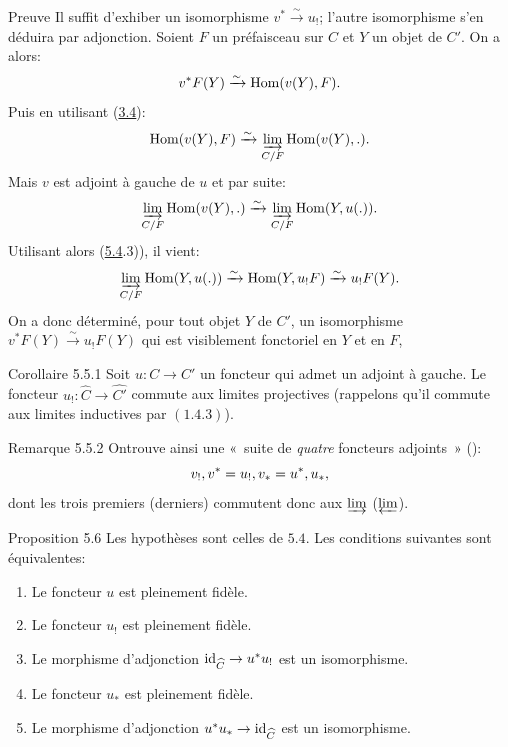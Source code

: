 \documentclass[10pt]{../fichiers-configuration-latex/smfart}
\def\labelenumi{(\theenumi)}
\begin{document}
\begin{enonce*}[remark]{Preuve}
Il suffit d'exhiber un isomorphisme $v^\ast\xrightarrow{\sim}
u_{!}$; l'autre isomorphisme s'en déduira par adjonction. Soient $F$
un préfaisceau sur $C$ et $Y$ un objet de $C'$. On a alors:
$$
v^\ast F(Y)\xrightarrow{\sim} \operatorname{Hom}(v(Y),F){}.
$$
Puis en utilisant (\hyperref[I.prop3.4]{3.4}):
$$
\operatorname{Hom}(v(Y),F)\xrightarrow{\sim} \varinjlim_{C/F} \operatorname{Hom}(v(Y),.){}.
$$
Mais $v$ est adjoint à gauche de $u$ et par suite:
$$
\varinjlim_{C/F}\operatorname{Hom}(v(Y),.)\xrightarrow{\sim}\varinjlim_{C/F}\operatorname{Hom}(Y,u(.)){}.
$$
Utilisant alors (\hyperref[I.prop5.4]{5.4}.3)), il vient:
$$
\varinjlim_{C/F}\operatorname{Hom}(Y,u(.))\xrightarrow{\sim}
\operatorname{Hom}(Y,u_{!}F)\xrightarrow{\sim} u_{!}F(Y){}.
$$
On a donc déterminé, pour tout objet $Y$ de $C'$, un isomorphisme
$v^\ast F(Y)\xrightarrow{\sim} u_{!}F(Y)$ qui est visiblement
fonctoriel en $Y$ et en $F$, \cqfd
\end{enonce*}

\begin{enonce*}{Corollaire 5.5.1}
Soit $u:C\rightarrow C'$ un foncteur qui admet un adjoint à gauche.
Le foncteur $u_{!}:\widehat{C}\rightarrow
\widehat{C'}$ commute aux limites projectives
(rappelons qu'il commute aux limites inductives par $(1.4.3)$).
\end{enonce*}

\begin{enonce*}[remark]{Remarque 5.5.2}
On\pageoriginale trouve ainsi une « suite de \emph{quatre}
foncteurs adjoints » ():
$$
v_{!}, v^\ast=u_{!}, v_\ast = u^\ast, u_\ast{},
$$
dont les trois premiers (\resp  derniers) commutent donc aux
$\varinjlim$ (\resp  $\varprojlim$).
\end{enonce*}

\begin{enonce*}{Proposition 5.6}
Les hypothèses sont celles de $\hyperref[I.prop5.4]{5.4}$. Les conditions
suivantes sont équivalentes:
\begin{enumerate}
\renewcommand{\theenumi}{\roman{enumi}}
\renewcommand{\labelenumi}{\theenumi)}
\item Le foncteur $u$ est pleinement fidèle.

\item Le foncteur $u_{!}$ est pleinement fidèle.

\item Le morphisme d'adjonction
  $\operatorname{id}_{\widehat{C}}\rightarrow u^\ast u_{!}$ est un
  isomorphisme.

\item Le foncteur $u_\ast$ est pleinement fidèle.

\item Le morphisme d'adjonction $u^\ast u_\ast\rightarrow
  \operatorname{id}_{\widehat{C}}$ est un isomorphisme.
\end{enumerate}
\end{enonce*}
\end{document}
